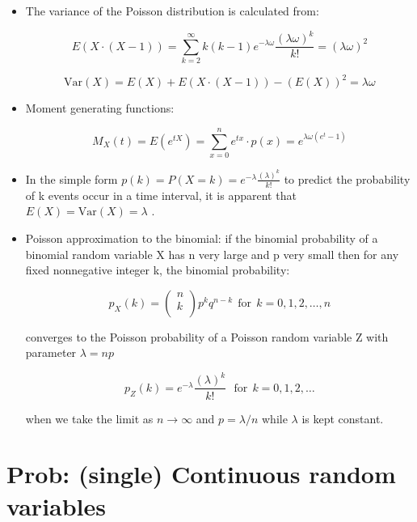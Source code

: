 \documentclass[12pt]{report}
\renewcommand{\_}{\kern-1.5pt\textunderscore\kern-1.5pt}
\begin{document}
\begin{itemize}
\begin{itemize}
	\item The variance of the Poisson distribution is calculated from:\par

 \[ E \left( X \cdot  \left( X-1 \right)  \right) = \sum _{k=2}^{\infty}k \left( k-1 \right) e^{- \lambda  \omega }\frac{ \left(  \lambda  \omega  \right) ^{k}}{k!}= \left(  \lambda  \omega  \right) ^{2} \] \par

 \[ \mathrm{Var} \left( X \right) =E \left( X \right) +E \left( X \cdot  \left( X-1 \right)  \right) - \left( E \left( X \right)  \right) ^{2}= \lambda  \omega  \] \par

	\item Moment generating functions:\par

 \[ M_{X} \left( t \right) =E \left( e^{tX} \right) = \sum _{x=0}^{n}e^{tx} \cdot p \left( x \right) =e^{ \lambda  \omega  \left( e^{t}-1 \right) } \] \par

	\item In the simple form  \( p \left( k \right) =P \left( X=k \right) =e^{- \lambda }\frac{ \left(  \lambda  \right) ^{k}}{k!} \)  to predict the probability of k events occur in a time interval, it is apparent that  \( E \left( X \right) =\mathrm{Var} \left( X \right) = \lambda  \) .\par

	\item Poisson approximation to the binomial: if the binomial probability of a binomial random variable X has n very large and p very small then for any fixed nonnegative integer k, the binomial probability:\par

 \[ p_{X} \left( k \right) = \left( \begin{matrix}
n\\
k\\
\end{matrix}
 \right) p^{k}q^{n-k}~~\mathrm{for~~}k=0, 1, 2, \ldots , n \] \par

converges to the Poisson probability of a Poisson random variable Z with parameter  \(  \lambda =np \) \par

 \[ p_{Z} \left( k \right) =e^{- \lambda }\frac{ \left(  \lambda  \right) ^{k}}{k!}~~~\mathrm{for~~}k=0, 1, 2, \ldots  \] \par

when we take the limit as  \( n \rightarrow \infty \)  and  \( p= \lambda /n \)  while  \(  \lambda  \)  is kept constant.\par


\end{itemize}
\end{itemize}\section*{Prob: (single) Continuous random variables}
\end{document}
